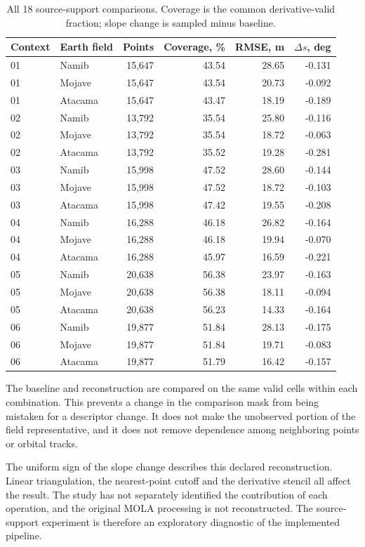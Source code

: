 \documentclass{article}
\begin{document}
\begin{table}[h]
\centering\small
\caption{All 18 source-support comparisons. Coverage is the common derivative-valid fraction; slope change is sampled minus baseline.}
\label{tab:all-support}
\begin{tabular}{llrrrr}
\toprule
Context & Earth field & Points & Coverage, \% & RMSE, m & $\Delta s$, deg\\
\midrule
01 & Namib & 15,647 & 43.54 & 28.65 & -0.131 \\
01 & Mojave & 15,647 & 43.54 & 20.73 & -0.092 \\
01 & Atacama & 15,647 & 43.47 & 18.19 & -0.189 \\
02 & Namib & 13,792 & 35.54 & 25.80 & -0.116 \\
02 & Mojave & 13,792 & 35.54 & 18.72 & -0.063 \\
02 & Atacama & 13,792 & 35.52 & 19.28 & -0.281 \\
03 & Namib & 15,998 & 47.52 & 28.60 & -0.144 \\
03 & Mojave & 15,998 & 47.52 & 18.72 & -0.103 \\
03 & Atacama & 15,998 & 47.42 & 19.55 & -0.208 \\
04 & Namib & 16,288 & 46.18 & 26.82 & -0.164 \\
04 & Mojave & 16,288 & 46.18 & 19.94 & -0.070 \\
04 & Atacama & 16,288 & 45.97 & 16.59 & -0.221 \\
05 & Namib & 20,638 & 56.38 & 23.97 & -0.163 \\
05 & Mojave & 20,638 & 56.38 & 18.11 & -0.094 \\
05 & Atacama & 20,638 & 56.23 & 14.33 & -0.164 \\
06 & Namib & 19,877 & 51.84 & 28.13 & -0.175 \\
06 & Mojave & 19,877 & 51.84 & 19.71 & -0.083 \\
06 & Atacama & 19,877 & 51.79 & 16.42 & -0.157 \\
\bottomrule
\end{tabular}
\end{table}

The baseline and reconstruction are compared on the same valid cells within each combination. This prevents a change in the comparison mask from being mistaken for a descriptor change. It does not make the unobserved portion of the field representative, and it does not remove dependence among neighboring points or orbital tracks.

The uniform sign of the slope change describes this declared reconstruction. Linear triangulation, the nearest-point cutoff and the derivative stencil all affect the result. The study has not separately identified the contribution of each operation, and the original MOLA processing is not reconstructed. The source-support experiment is therefore an exploratory diagnostic of the implemented pipeline.
\end{document}
